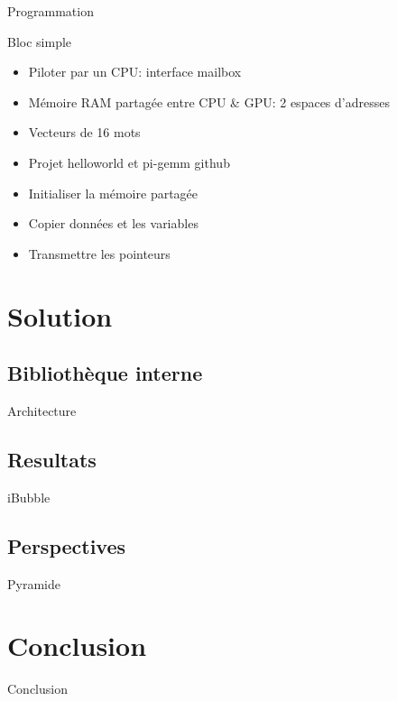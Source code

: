 \documentclass{bredelebeamer}
\begin{document}
\begin{frame}{Programmation}
\begin{block}{Bloc simple}
\begin{itemize}
\item Piloter par un CPU: interface mailbox
\item Mémoire RAM partagée entre CPU \& GPU: 2 espaces d'adresses
\item Vecteurs de 16 mots
\item Projet helloworld et pi-gemm github
\item Initialiser la mémoire partagée
\item Copier données et les variables
\item Transmettre les pointeurs
\end{itemize}
\end{block}
\end{frame}



\section{Solution}
	\subsection{Bibliothèque interne}

\begin{frame}{Architecture}
\end{frame}

	\subsection{Resultats}
\begin{frame}{iBubble}
\end{frame}

	\subsection{Perspectives}
\begin{frame}{Pyramide}
\end{frame}




\section{Conclusion}

\begin{frame}{Conclusion}
\end{frame}
\end{document}
